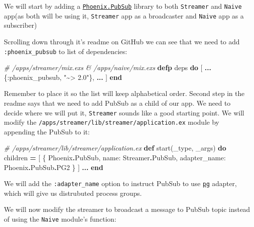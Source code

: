 \documentclass[
  oneside]{book}
\newenvironment{Shaded}{\begin{snugshade}}{\end{snugshade}}
\newcommand{\CommentTok}[1]{\textcolor[rgb]{0.56,0.35,0.01}{\textit{#1}}}
\newcommand{\ConstantTok}[1]{\textcolor[rgb]{0.00,0.00,0.00}{#1}}
\newcommand{\KeywordTok}[1]{\textcolor[rgb]{0.13,0.29,0.53}{\textbf{#1}}}
\newcommand{\NormalTok}[1]{#1}
\newcommand{\OperatorTok}[1]{\textcolor[rgb]{0.81,0.36,0.00}{\textbf{#1}}}
\newcommand{\StringTok}[1]{\textcolor[rgb]{0.31,0.60,0.02}{#1}}
\newcommand{\VariableTok}[1]{\textcolor[rgb]{0.00,0.00,0.00}{#1}}
\begin{document}
We will start by adding a \href{https://github.com/phoenixframework/phoenix_pubsub}{\texttt{Phoenix.PubSub}} library to both \texttt{Streamer} and \texttt{Naive} app(as both will be using it, \texttt{Streamer} app as a broadcaster and \texttt{Naive} app as a subscriber)

Scrolling down through it's readme on GitHub we can see that we need to add \texttt{:phoenix\_pubsub} to list of dependencies:

\begin{Shaded}
\begin{Highlighting}[]
\CommentTok{\# /apps/streamer/mix.exs \& /apps/naive/mix.exs}
  \KeywordTok{defp}\NormalTok{ deps }\KeywordTok{do}
\NormalTok{    [}
      \OperatorTok{...}
\NormalTok{      \{}\VariableTok{:phoenix\_pubsub}\NormalTok{, }\StringTok{"\textasciitilde{}\textgreater{} 2.0"}\NormalTok{\},}
      \OperatorTok{...}
\NormalTok{    ]}
  \KeywordTok{end}
\end{Highlighting}
\end{Shaded}

Remember to place it so the list will keep alphabetical order. Second step in the readme says that we need to add PubSub as a child of our app. We need to decide where we will put it, \texttt{Streamer} sounds like a good starting point. We will modify the \texttt{/apps/streamer/lib/streamer/application.ex} module by appending the PubSub to it:

\begin{Shaded}
\begin{Highlighting}[]
\CommentTok{\# /apps/streamer/lib/streamer/application.ex}
  \KeywordTok{def}\NormalTok{ start(\_type, \_args) }\KeywordTok{do}
\NormalTok{    children }\OperatorTok{=}\NormalTok{ [}
\NormalTok{      \{}
        \ConstantTok{Phoenix}\OperatorTok{.}\ConstantTok{PubSub}\NormalTok{,}
        \VariableTok{name:} \ConstantTok{Streamer}\OperatorTok{.}\ConstantTok{PubSub}\NormalTok{, }\VariableTok{adapter\_name:} \ConstantTok{Phoenix}\OperatorTok{.}\ConstantTok{PubSub}\OperatorTok{.}\ConstantTok{PG2}
\NormalTok{      \}}
\NormalTok{    ]}
    \OperatorTok{...}
  \KeywordTok{end}
\end{Highlighting}
\end{Shaded}

We will add the \texttt{:adapter\_name} option to instruct PubSub to use \href{http://erlang.org/doc/man/pg.html}{\texttt{pg}} adapter, which will give us distrubuted process groups.

We will now modify the streamer to broadcast a message to PubSub topic instead of using the \texttt{Naive} module's function:
\end{document}
